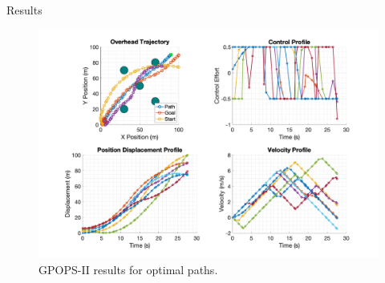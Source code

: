 \documentclass[9pt]{beamer}
\begin{document}



\begin{frame}{Results}
\begin{figure}
\includegraphics[width=\textwidth]{img/results.png}
\caption{GPOPS-II results for optimal paths.}
\end{figure}
\end{frame}
\end{document}
